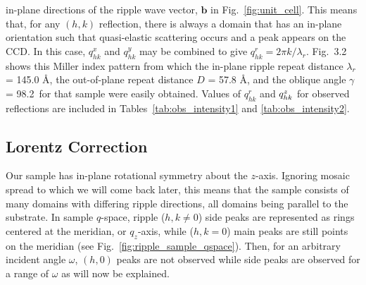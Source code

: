 in-plane directions of the
ripple wave vector, $\mathbf{b}$ in Fig.~\ref{fig:unit_cell}. 
This means that, for any $(h,k)$ reflection, there is always a domain that has 
an in-plane orientation such that quasi-elastic scattering occurs and a peak 
appears on the CCD.  
In this case, $q_{hk}^x$ and $q_{hk}^y$ may be combined to 
give $q_{hk}^r = 2\pi k/\lambda_r$.  
Fig.~3.2 shows this Miller index pattern from which the in-plane ripple repeat 
distance $\lambda_r$ = 145.0 \AA, the out-of-plane repeat distance 
$D$ = 57.8 \AA, and the oblique angle $\gamma$ = 98.2\textdegree\ for that 
sample were easily obtained.
Values of $q_{hk}^r$ and $q_{hk}^z$ for observed reflections are included
in Tables~\ref{tab:obs_intensity1} and \ref{tab:obs_intensity2}.

\subsection{Lorentz Correction}\label{sec:Lorentz_correction}
Our sample has in-plane rotational symmetry about the $z$-axis. 
Ignoring mosaic spread to which we will come back later, this means that the sample 
consists of many domains with differing ripple directions, all domains
being parallel to the substrate.  
In sample $q$-space, ripple ($h, k\neq 0$) side peaks are represented as rings 
centered at the meridian, or $q_z$-axis, 
while ($h, k=0$) main peaks are still points on the meridian 
(see Fig.~\ref{fig:ripple_sample_qspace}). 
Then, for an arbitrary incident angle $\omega$, $(h, 0)$ peaks are not observed
while side peaks are observed for a range of $\omega$ as will now be explained. 

